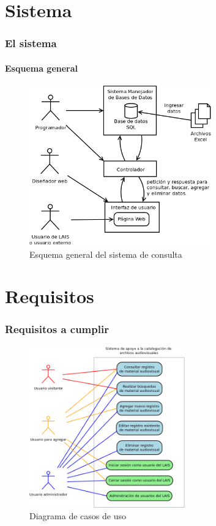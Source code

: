 \documentclass{beamer}
\begin{document}
\section{Sistema}
\begin{frame}
	\frametitle{El sistema}
	\framesubtitle{Esquema general}
	\begin{figure}[H]
		\centering
		\includegraphics[width=0.7\textwidth]{EsquemaGeneral.png}
		\caption{Esquema general del sistema de consulta}
		\label{fig:esquema_general}
	\end{figure}
\end{frame}

\section{Requisitos}
\begin{frame}
	\frametitle{Requisitos a cumplir}
	\begin{figure}[H]
		\centering
		\includegraphics[width=0.6\textwidth]{CasosDeUso.png}
		\caption{Diagrama de casos de uso}
		\label{fig:caso_de_uso}
	\end{figure}
\end{frame}
\end{document}
